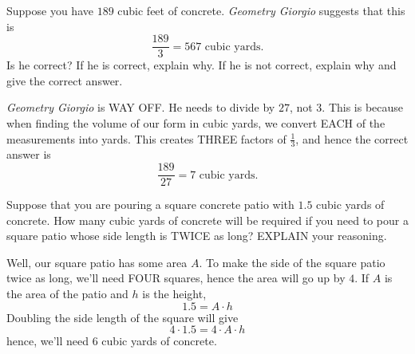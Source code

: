 \documentclass[handout,nooutcomes,noauthor]{ximera}
\begin{document}
\begin{question}
  Suppose you have $189$ cubic feet of concrete. \textit{Geometry
    Giorgio} suggests that this is
  \[
  \frac{189}{3} = 567 \text{ cubic yards}.
  \]
  Is he correct? If he is correct, explain why. If he is not correct,
  explain why and give the correct answer.
  \begin{freeResponse}
     \textit{Geometry Giorgio} is WAY OFF. He needs to divide by $27$,
     not $3$. This is because when finding the volume of our form in
     cubic yards, we convert EACH of the measurements into yards. This
     creates THREE factors of $\frac{1}{3}$, and hence the correct
     answer is
     \[
     \frac{189}{27} = 7 \text{ cubic yards}.
     \]
  \end{freeResponse}
\end{question}
\mynewpage


\begin{question}
  Suppose that you are pouring a square concrete patio with $1.5$
  cubic yards of concrete. How many cubic yards of concrete will be
  required if you need to pour a square patio whose side length is
  TWICE as long?  EXPLAIN your reasoning.
  \begin{freeResponse}
    Well, our square patio has some area $A$. To make the side of the
    square patio twice as long, we'll need FOUR squares, hence the
    area will go up by $4$. If $A$ is the area of the patio and $h$ is the height, 
    \[
    1.5 = A \cdot h
    \]
    Doubling the side length of the square will give
    \[
    4\cdot 1.5 = 4\cdot A \cdot h
    \]
    hence, we'll need $6$ cubic yards of concrete.
  \end{freeResponse}
\end{question}
\end{document}
